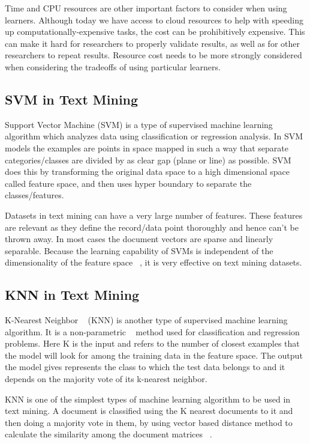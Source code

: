 \documentclass[sigconf]{acmart}
\theoremstyle{break}
\begin{document}
    Time and CPU resources are other important factors to consider when using learners. Although today we have access to cloud resources to help with speeding up computationally-expensive tasks, the cost can be prohibitively expensive. This can make it hard for researchers to properly validate results, as well as for other researchers to repeat results. Resource cost needs to be more strongly considered when considering the tradeoffs of using particular learners.
    
    \subsection{SVM in Text Mining}
    \label{sssec:SVM in Text Mining}
    Support Vector Machine (SVM) is a type of supervised machine learning algorithm which analyzes data using classification or regression analysis. In SVM models the examples are points in space mapped in such a way that separate categories/classes are divided by as clear gap (plane or line) as possible. SVM ~\cite{suykens1999least} does this by transforming the original data space to a high dimensional space called feature space, and then uses hyper boundary to separate the classes/features.  
    
    Datasets in text mining can have a very large number of features. These features are relevant as they define the record/data point thoroughly and hence can't be thrown away. In most cases the document vectors are sparse and linearly separable. Because the learning capability of SVMs is independent of the dimensionality of the feature space ~\cite{joachims1998text}, it is very effective on text mining datasets.
    
    \subsection{KNN in Text Mining}
    \label{sssec:KNN in Text Mining}
    K-Nearest Neighbor ~\cite{zhang2007ml} (KNN)  is another type of supervised machine learning algorithm. It is a non-parametric ~\cite{goldberger2005neighbourhood} method used for classification and regression problems. Here K is the input and refers to the number of closest examples that the model will look for among the training data in the feature space. The output the model gives represents the class to which the test data belongs to and it depends on the majority vote of its k-nearest neighbor.
  
    KNN is one of the simplest types of machine learning algorithm to be used in text mining. A document is classified using the K nearest documents to it and then doing a majority vote in them, by using vector based distance method to calculate the similarity among the document matrices ~\cite{mihalcea2006corpus}.
    
\end{document}
